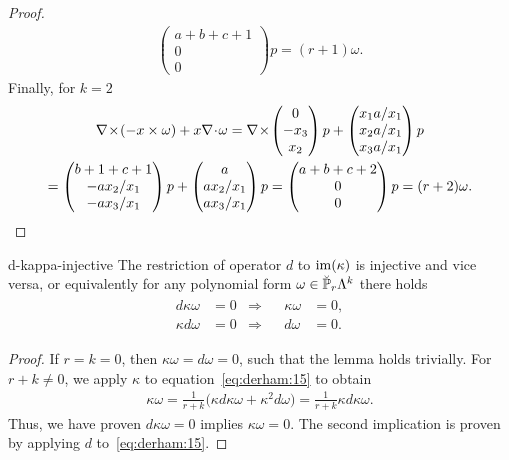 \begin{proof}
\begin{multline}
\begin{pmatrix}
      a+b+c+1 \\0\\0
    \end{pmatrix}p
    = (r+1)\omega.
  \end{multline}
  Finally, for $k=2$
  \begin{multline}
    \curl(-x\times \omega) + x \div \omega
    = \curl
    \begin{pmatrix}
      0 \\ -x_3 \\ x_2
    \end{pmatrix}p
    +
    \begin{pmatrix}
      x_1 a/x_1\\x_2 a/x_1\\x_3 a/x_1\\
    \end{pmatrix}p
    \\=
    \begin{pmatrix}
      b+1+c+1\\-ax_2/x_1 \\ -a x_3/x_1
    \end{pmatrix}p
    +
    \begin{pmatrix}
      a\\ax_2/x_1\\ax_3/x_1
    \end{pmatrix}p
    =
    \begin{pmatrix}
      a+b+c+2\\0\\0
    \end{pmatrix}p
    = (r+2)\omega.
  \end{multline}
\end{proof}

\begin{Lemma}{d-kappa-injective}
  The restriction of operator $d$ to $\range \kappa$ is injective and
  vice versa, or equivalently for any polynomial form
  $\omega\in \breve \P_r\Lambda^k$ there holds
  \begin{gather}
    \label{eq:derham:16}
    \begin{aligned}
      d\kappa\omega &= 0 &\Longrightarrow&& \kappa\omega &= 0,\\
      \kappa d\omega &= 0 &\Longrightarrow&& d\omega &= 0.
    \end{aligned}
  \end{gather}
\end{Lemma}

\begin{proof}
  If $r=k=0$, then $\kappa\omega = d\omega = 0$, such that the lemma
  holds trivially. For $r+k\neq 0$, we apply $\kappa$ to
  equation~\eqref{eq:derham:15} to obtain
  \begin{gather}
    \kappa\omega = \frac1{r+k}
    \bigl(\kappa d\kappa\omega + \kappa^2d\omega\bigr)
    = \frac1{r+k}\kappa d\kappa\omega.
  \end{gather}
  Thus, we have proven $d\kappa\omega=0$ implies $\kappa\omega=0$. The
  second implication is proven by applying $d$ to~\eqref{eq:derham:15}.
\end{proof}

